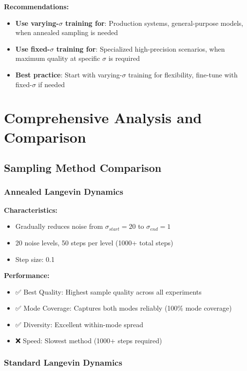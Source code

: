 \documentclass[12pt,a4paper]{article}
\begin{document}
\textbf{Recommendations:}

\begin{itemize}
    \item \textbf{Use varying-$\sigma$ training for}: Production systems, general-purpose models, when annealed sampling is needed
    \item \textbf{Use fixed-$\sigma$ training for}: Specialized high-precision scenarios, when maximum quality at specific $\sigma$ is required
    \item \textbf{Best practice}: Start with varying-$\sigma$ training for flexibility, fine-tune with fixed-$\sigma$ if needed
\end{itemize}

\section{Comprehensive Analysis and Comparison}

\subsection{Sampling Method Comparison}

\subsubsection{Annealed Langevin Dynamics}

\textbf{Characteristics:}
\begin{itemize}
    \item Gradually reduces noise from $\sigma_{start}=20$ to $\sigma_{end}=1$
    \item 20 noise levels, 50 steps per level (1000+ total steps)
    \item Step size: 0.1
\end{itemize}

\textbf{Performance:}
\begin{itemize}
    \item ✅ Best Quality: Highest sample quality across all experiments
    \item ✅ Mode Coverage: Captures both modes reliably (100\% mode coverage)
    \item ✅ Diversity: Excellent within-mode spread
    \item ❌ Speed: Slowest method (1000+ steps required)
\end{itemize}

\subsubsection{Standard Langevin Dynamics}
\end{document}
